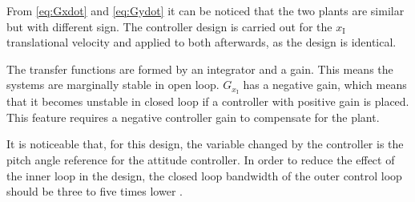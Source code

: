 From \autoref{eq:Gxdot} and \ref{eq:Gydot} it can be noticed that the two plants are similar but with different sign. The controller design is carried out for the $x_{\mathrm{I}}$ translational velocity and applied to both afterwards, as the design is identical.

The transfer functions are formed by an integrator and a gain. This means the systems are marginally stable in open loop. $G_{x_{\mathrm{I}}}$ has a negative gain, which means that it becomes unstable in closed loop if a controller with positive gain is placed. This feature requires a negative controller gain to compensate for the plant.

It is noticeable that, for this design, the variable changed by the controller is the pitch angle reference for the attitude controller. In order to reduce the effect of the inner loop in the design, the closed loop bandwidth of the outer control loop should be three to five times lower .

